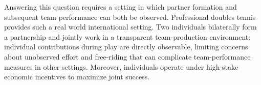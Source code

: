 \documentclass[10pt]{article}
\begin{document}
Answering this question requires a setting in which partner formation and subsequent team performance can both be observed. Professional doubles tennis provides such a real world international setting. %
Two individuals bilaterally form a partnership and jointly work in a transparent team-production environment: individual contributions during play are directly observable, limiting concerns about unobserved effort and free-riding that can complicate team-performance measures in other settings. Moreover, individuals operate under high-stake economic incentives to maximize joint success. 
\end{document}
